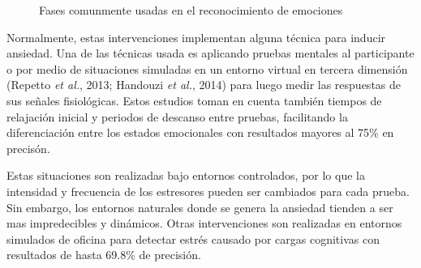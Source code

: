 \begin{figure}[h]
	\centering
	\caption{Fases comunmente usadas en el reconocimiento de emociones} \label{fig:anxiDetection}
\end{figure}

Normalmente, estas intervenciones implementan alguna t\'ecnica para inducir ansiedad. Una de las t\'ecnicas usada es aplicando pruebas mentales al participante \citep{rani2007anxiety} o por medio de situaciones simuladas en un entorno virtual en tercera dimensi\'on (Repetto \textit{et al.}, 2013; Handouzi \textit{et al.}, 2014) para luego medir las respuestas de sus se\~nales fisiol\'ogicas. Estos estudios toman en cuenta tambi\'en tiempos de relajaci\'on inicial y periodos de descanso entre pruebas, facilitando la diferenciaci\'on entre los estados emocionales con resultados mayores al 75\% en precis\'on.

Estas situaciones son realizadas bajo entornos controlados, por lo que la intensidad y frecuencia de los estresores pueden ser cambiados para cada prueba. Sin embargo, los entornos naturales donde se genera la ansiedad tienden a ser mas impredecibles y din\'amicos. Otras intervenciones son realizadas en entornos simulados de oficina para detectar estr\'es causado por cargas cognitivas \citep{Cinaz13} con resultados de hasta 69.8\% de precisi\'on.

